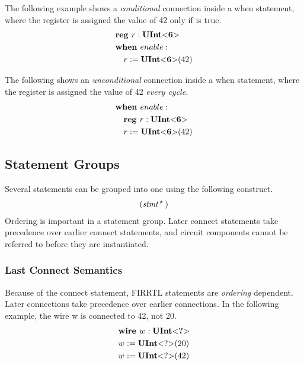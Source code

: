 \documentclass[12pt]{article}
\begin{document}
The following example shows a {\em conditional} connection inside a when statement, where the register  is assigned the value of 42 only if  is true.
\[
\begin{aligned}
&\text{\bf reg\ } r : \text{\bf UInt}\text{\bf $<$} \text{\bf 6} \text{\bf $>$} \\
&\text{\bf when\ } enable : \\
&\quad r := \text{\bf UInt}\text{\bf $<$} \text{\bf 6} \text{\bf $>$}(42) \\
\end{aligned}
\]

The following shows an {\em unconditional} connection inside a when statement, where the register  is assigned the value of 42 {\em every cycle}.
\[
\begin{aligned}
&\text{\bf when\ } enable : \\
&\quad \text{\bf reg\ } r : \text{\bf UInt}\text{\bf $<$} \text{\bf 6} \text{\bf $>$} \\
&\quad r := \text{\bf UInt}\text{\bf $<$} \text{\bf 6} \text{\bf $>$}(42) \\
\end{aligned}
\]

\subsection{Statement Groups}
Several statements can be grouped into one using the following construct.
\[
\begin{aligned}
(\text{\em stmt*\ })
\end{aligned}
\]
Ordering is important in a statement group.
Later connect statements take precedence over earlier connect statements, and circuit components cannot be referred to before they are instantiated.

\subsubsection{Last Connect Semantics}
Because of the connect statement, FIRRTL statements are {\em ordering} dependent.
Later connections take precedence over earlier connections.
In the following example, the wire w is connected to 42, not 20. 
\[
\begin{aligned}
&\text{\bf wire\ } w : \text{\bf UInt}\text{\bf $<$} \text{\bf ?} \text{\bf $>$} \\
&w := \text{\bf UInt}\text{\bf $<$} ? \text{\bf $>$}(20) \\
&w := \text{\bf UInt}\text{\bf $<$} ? \text{\bf $>$}(42) \\
\end{aligned}
\]
\end{document}
